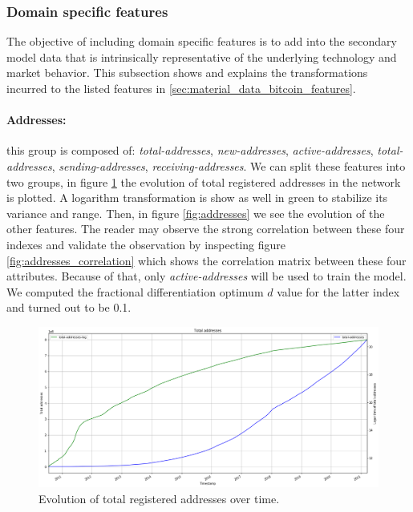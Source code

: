 \subsubsection{Domain specific features}
\label{sec:methods_features_domain}

The objective of including domain specific features is to add into the
secondary model data that is intrinsically representative of the underlying
technology and market behavior. This subsection shows and explains the
transformations incurred to the listed features in \ref{sec:material_data_bitcoin_features}.

\paragraph{Addresses:} this group is composed of: \emph{total-addresses},
\emph{new-addresses}, \emph{active-addresses}, \emph{total-addresses},
\emph{sending-addresses}, \emph{receiving-addresses}. We can split these
features into two groups, in figure \ref{fig:total_addresses} the evolution of
total registered addresses in the network is plotted. A logarithm transformation
is show as well in green to stabilize its variance and range. Then, in figure
\ref{fig:addresses} we see the evolution of the other features. The reader may
observe the strong correlation between these four indexes and validate the
observation by inspecting figure \ref{fig:addresses_correlation} which shows the
correlation matrix between these four attributes. Because of that, only
\emph{active-addresses} will be used to train the model. We computed the
fractional differentiation optimum $d$ value for the latter index and turned out
to be 0.1. 

\begin{figure}[H]
    \centering
    \includegraphics[width=\textwidth]{methods/images/total_addresses.png}
    \caption{Evolution of total registered addresses over time.}
    \label{fig:total_addresses}
\end{figure}


